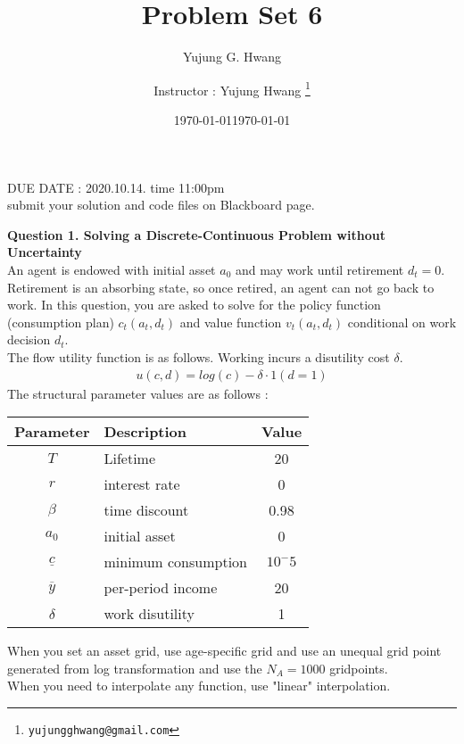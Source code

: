\documentclass[paper=a4, fontsize=13pt]{extarticle} %
\author{Yujung G. Hwang} %
\date{\today} %
\numberwithin{equation}{section} %
\numberwithin{figure}{section} %
\numberwithin{table}{section} %
\begin{document}
\title{	
\normalfont \normalsize 
\huge Problem Set 6
}
\author{
Instructor : Yujung Hwang \thanks{\texttt{yujungghwang@gmail.com}}} %
\date{\today} %
\maketitle %

\upshape \mdseries 
\begin{center}
DUE DATE : 2020.10.14. time 11:00pm \\
submit your solution and code files on Blackboard page.
\end{center}

\normalsize
\textbf{Question 1. Solving a Discrete-Continuous Problem without Uncertainty} \\
An agent is endowed with initial asset $a_0$ and may work until retirement $d_t=0$. Retirement is an absorbing state, so once retired, an agent can not go back to work. In this question, you are asked to solve for the policy function (consumption plan) $c_t(a_t,d_t)$ and value function $v_t(a_t,d_t)$ conditional on work decision $d_t$.  \\
The flow utility function is as follows. Working incurs a disutility cost $\delta$.
\begin{gather}
u(c,d) = log(c) -\delta \cdot 1(d=1)
\end{gather}
The structural parameter values are as follows : \\
\begin{table}[H]
\centering
\begin{tabular}{c l c}
\hline
Parameter & Description & Value \\
\hline
$T$ & Lifetime & 20 \\
$r$ & interest rate & 0 \\
$\beta$ & time discount & 0.98 \\
$a_0$ & initial asset & 0 \\
$\underline{c}$ & minimum consumption & $10^-5$ \\
$\overline{y}$ & per-period income & 20 \\
$\delta$ & work disutility & 1 \\
\hline
\end{tabular}
\end{table}
When you set an asset grid, use age-specific grid and use an unequal grid point generated from log transformation and use the $N_A=1000$ gridpoints. \\
When you need to interpolate any function, use "linear" interpolation.\\
\end{document}
